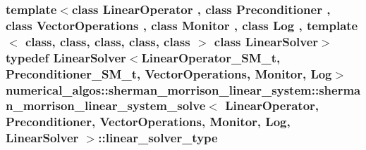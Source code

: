 \hypertarget{classnumerical__algos_1_1sherman__morrison__linear__system_1_1sherman__morrison__linear__system__solve_a0a05cc7927e440224dfdef6aeb93e4b7}{
\subsubsection[{linear\-\_\-solver\-\_\-type}]{\setlength{\rightskip}{0pt plus 5cm}template$<$class Linear\-Operator , class Preconditioner , class Vector\-Operations , class Monitor , class Log , template$<$ class, class, class, class, class $>$ class Linear\-Solver$>$ typedef Linear\-Solver$<${\bf Linear\-Operator\-\_\-\-S\-M\-\_\-t}, {\bf Preconditioner\-\_\-\-S\-M\-\_\-t}, Vector\-Operations, Monitor, Log$>$ {\bf numerical\-\_\-algos\-::sherman\-\_\-morrison\-\_\-linear\-\_\-system\-::sherman\-\_\-morrison\-\_\-linear\-\_\-system\-\_\-solve}$<$ Linear\-Operator, Preconditioner, Vector\-Operations, Monitor, Log, Linear\-Solver $>$\-::{\bf linear\-\_\-solver\-\_\-type}}}\label{classnumerical__algos_1_1sherman__morrison__linear__system_1_1sherman__morrison__linear__system__solve_a0a05cc7927e440224dfdef6aeb93e4b7}
